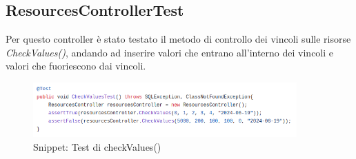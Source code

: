 \documentclass{article}
\begin{document}
{\subsection{ResourcesControllerTest}\label{subsection:resourcescontrollertest}
Per questo controller è stato testato il metodo di controllo dei vincoli sulle risorse \textit{CheckValues()}, andando ad inserire valori che entrano all'interno dei vincoli e valori che fuoriescono dai vincoli.
\begin{figure}[H]
                \centering
                \includegraphics[width=0.9\textwidth]{Images/Snippets/CheckValuesTest.png}
                \captionsetup{labelformat=empty,labelsep=none}
                \caption{Snippet: Test di checkValues()}
                \label{fig:resourcescontrollertest}
            \end{figure}
}
\end{document}
